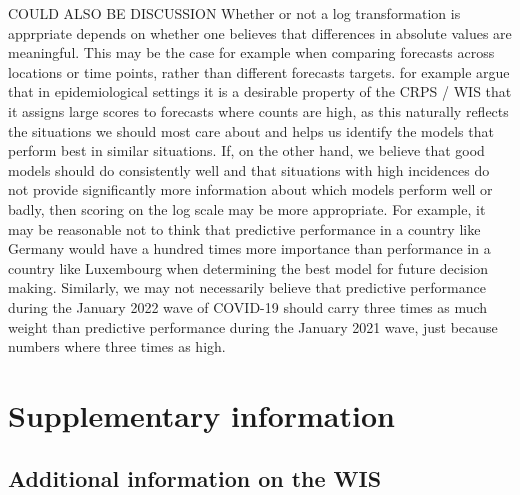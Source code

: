 \documentclass{article}
\begin{document}
COULD ALSO BE DISCUSSION
Whether or not a log transformation is apprpriate depends on whether one believes that differences in absolute values are meaningful. This may be the case for example when comparing forecasts across locations or time points, rather than different forecasts targets. \cite{bracherEvaluatingEpidemicForecasts2021} for example argue that in epidemiological settings it is a desirable property of the CRPS / WIS that it assigns large scores to forecasts where counts are high, as this naturally reflects the situations we should most care about and helps us identify the models that perform best in similar situations. If, on the other hand, we believe that good models should do consistently well and that situations with high incidences do not provide significantly more information about which models perform well or badly, then scoring on the log scale may be more appropriate. For example, it may be reasonable not to think that predictive performance in a country like Germany would have a hundred times more importance than performance in a country like Luxembourg when determining the best model for future decision making. Similarly, we may not necessarily believe that predictive performance during the January 2022 wave of COVID-19 should carry three times as much weight than predictive performance during the January 2021 wave, just because numbers where three times as high. 










\newpage

\appendix
\section{Supplementary information}


\subsection{Additional information on the WIS} \label{wis}
\end{document}
